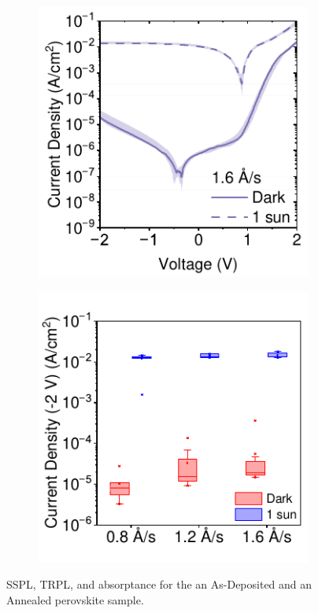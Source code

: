 \begin{figure}[htbp]
    \begin{subfigure}[t]{0.4\textwidth}
        \centering
        \includegraphics[width=\textwidth]{chapters/material_properties/images/16AS-JV.pdf} %
        \caption{}
        \label{fig:ch2:1.6A/s-jv}
    \end{subfigure}
    \hfill
    \begin{subfigure}[t]{0.4\textwidth}
        \centering
        \includegraphics[width=\textwidth]{chapters/material_properties/images/Evap_Rate_Box_Plot.pdf} %
        \caption{}
        \label{fig:ch2:box_plot_evap_rate}
    \end{subfigure}
    \caption{SSPL, TRPL, and absorptance for the an As-Deposited and an Annealed perovskite sample.}
\end{figure}

